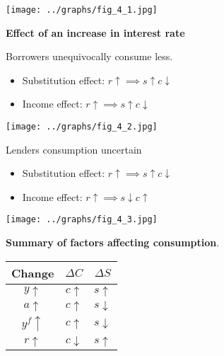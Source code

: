 \documentclass[letterpaper, 9pt,landscape]{extarticle}
\begin{document}
\begin{multicols*}{5}
\begin{remark}
    \begin{center}
    \texttt{[image: ../graphs/fig\_4\_1.jpg]}
    \end{center}
\end{remark}

\begin{remark}
    \textbf{Effect of an increase in interest rate} \\
    \begin{minipage}{0.48\columnwidth}
        Borrowers unequivocally consume less.
        \begin{itemize}
            \item Substitution effect: $r \uparrow \implies s \uparrow c \downarrow$
            \item Income effect: $r \uparrow \implies s \uparrow c \downarrow$
        \end{itemize} 
    \begin{center}
    \texttt{[image: ../graphs/fig\_4\_2.jpg]}
    \end{center}
    \end{minipage}
    \hfill
    \begin{minipage}{0.48\columnwidth}
        Lenders consumption uncertain
        \begin{itemize}
            \item Substitution effect: $r \uparrow \implies s \uparrow c \downarrow$
            \item Income effect: $r \uparrow \implies s \downarrow c \uparrow$
        \end{itemize} 
    \begin{center}
    \texttt{[image: ../graphs/fig\_4\_3.jpg]}
    \end{center}
    \end{minipage}
\end{remark}

\begin{remark}
    \textbf{Summary of factors affecting consumption}. \\
    \begin{center}
    \begin{tabular}{c | c | c}
    \textbf{Change} & $\Delta C$ & $\Delta S$ \\ \hline
    $y \uparrow$     & $c \uparrow$     & $s \uparrow$     \\
    $a \uparrow$     & $c \uparrow$     & $s \downarrow$   \\
    $y^{f} \uparrow$ & $c \uparrow$     & $s \downarrow$   \\
    $r \uparrow$     & $c \downarrow$   & $s \uparrow$     \\
    \end{tabular}
    \end{center}


\end{remark}
\end{multicols*}
\end{document}
